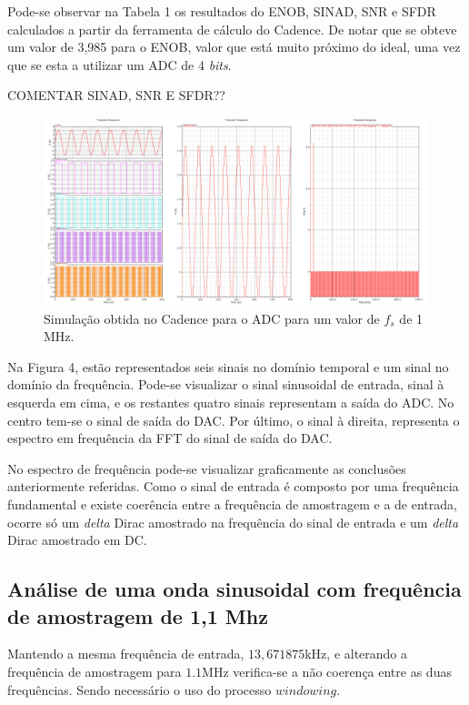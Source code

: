 \documentclass[11pt]{article}
\numberwithin{equation}{section}
\begin{document}
Pode-se observar na Tabela 1 os resultados do ENOB, SINAD, SNR e SFDR calculados a partir da ferramenta de cálculo do Cadence. De notar que se obteve um valor de 3,985 para o ENOB, valor que está muito próximo do ideal, uma vez que se esta a utilizar um ADC de 4 \textit{bits}.

COMENTAR SINAD, SNR E SFDR??

\begin{figure}[h]
	\centering
	\includegraphics[keepaspectratio=true, scale=0.32]{lab/f_fft_1M.png}
	\caption{Simulação obtida no Cadence para o ADC para um valor de $f_{s}$ de 1 MHz.}
	\vspace{-0.8em}
\end{figure}
	 
Na Figura 4, estão representados seis sinais no domínio temporal e um sinal no domínio da frequência. Pode-se visualizar o sinal sinusoidal de entrada, sinal à esquerda em cima, e os restantes quatro sinais representam a saída do ADC. No centro tem-se o sinal de saída do DAC. Por último, o sinal à direita, representa o espectro em frequência da FFT do sinal de saída do DAC.

No espectro de frequência pode-se visualizar graficamente as conclusões anteriormente referidas. Como o sinal de entrada é composto por uma frequência fundamental e existe coerência entre a frequência de amostragem e a de entrada, ocorre só um \textit{delta} Dirac amostrado na frequência do sinal de entrada e um \textit{delta} Dirac amostrado em DC.

\subsection{Análise de uma onda sinusoidal com frequência de amostragem de 1,1 Mhz}

Mantendo a mesma frequência de entrada, $13,671875$kHz, e alterando a frequência de amostragem para $1.1$MHz verifica-se a não coerença entre as duas frequências.
Sendo necessário o uso do processo $windowing$.
\end{document}
